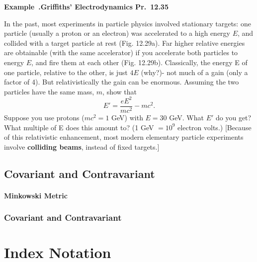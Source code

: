 \documentclass[12pt,oneside]{book}
\newcounter{example}[chapter]
\newenvironment{example}[2]{\noindent\refstepcounter{example}\par\medskip
	\noindent\textbf{Example~\thechapter.\theexample\quad #1} 
	\par\medskip\noindent#2
	\rmfamily}{\medskip}
\begin{document}
\begin{example}{Griffiths' Electrodynamics Pr.\ 12.35}
{In the past, most experiments in particle physics involved stationary targets: one particle (usually a proton or an electron) was accelerated to a high energy $E$, and collided with a target particle at rest (Fig. 12.29a). Far higher relative energies are obtainable (with the same accelerator) if you accelerate both particles to energy $E$, and fire them at each other (Fig. 12.29b). Classically, the energy E of one particle, relative to the other, is just $4E$ (why?)- not much of a gain (only a factor of 4). But relativistically the gain can be enormous. Assuming the two particles have the same mass, $m$, show that 
$$
	E' = \frac{eE^2}{mc^2} - mc^2.
$$
Suppose you use protons ($mc^2=1$ GeV) with $E = 30$ GeV. What $E'$ do you get? What multiple of E does this amount to? (1 GeV $=10^9$ electron volts.) [Because of this relativistic enhancement, most modern elementary particle experiments involve {\bf colliding beams}, instead of fixed targets.]
}
\end{example}

\section{Covariant and Contravariant}
\subsubsection{Minkowski Metric}
\subsection{Covariant and Contravariant}


\appendix
\chapter{Index Notation}
\end{document}
